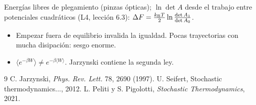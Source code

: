 \documentclass[11pt,a4paper]{article}
\begin{document}
\begin{aplicacion}
Energías libres de plegamiento (pinzas ópticas); $\ln\det A$ desde el trabajo entre potenciales cuadráticos (L4, lección 6.3):
$\Delta F=\frac{k_{\mathrm B} T}2\ln\frac{\det A_1}{\det A_0}$.
\end{aplicacion}

\begin{error}
\begin{itemize}[nosep]
\item Empezar fuera de equilibrio invalida la igualdad. \quad Pocas trayectorias con mucha disipación: sesgo enorme.
\item $\langle e^{-\beta W}\rangle\neq e^{-\beta\langle W\rangle}$. \quad Jarzynski contiene la segunda ley.
\end{itemize}
\end{error}

\begin{thebibliography}{9}\small
{} C. Jarzynski, \emph{Phys. Rev. Lett.} 78, 2690 (1997).
 U. Seifert, Stochastic thermodynamics..., 2012.
 L. Peliti y S. Pigolotti, \emph{Stochastic Thermodynamics}, 2021.
\end{thebibliography}
\end{document}
